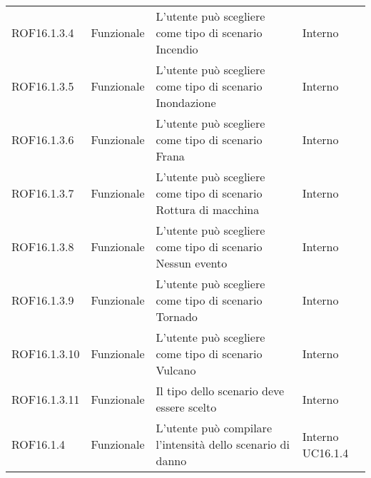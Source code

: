 \begin{longtable}{p{2cm}!{\VRule[1pt]}p{2cm}!{\VRule[1pt]}p{5cm}!{\VRule[1pt]}p{1.5cm}}
	ROF16.1.3.4                      & Funzionale\newline               & L'utente può scegliere come tipo di scenario Incendio                                                                    & Interno                      \\
	ROF16.1.3.5                      & Funzionale\newline               & L'utente può scegliere come tipo di scenario Inondazione                                                                 & Interno                      \\
	ROF16.1.3.6                      & Funzionale\newline               & L'utente può scegliere come tipo di scenario Frana                                                                       & Interno                      \\
	ROF16.1.3.7                      & Funzionale\newline               & L'utente può scegliere come tipo di scenario Rottura di macchina                                                         & Interno                      \\
	ROF16.1.3.8                      & Funzionale\newline               & L'utente può scegliere come tipo di scenario Nessun evento                                                               & Interno                      \\
	ROF16.1.3.9                      & Funzionale\newline               & L'utente può scegliere come tipo di scenario Tornado                                                                     & Interno                      \\
	ROF16.1.3.10                     & Funzionale\newline               & L'utente può scegliere come tipo di scenario Vulcano                                                                     & Interno                      \\
	ROF16.1.3.11                     & Funzionale\newline               & Il tipo dello scenario deve essere scelto                                                                                 & Interno                      \\
	ROF16.1.4                        & Funzionale\newline               & L'utente può compilare l'intensità  dello scenario di danno                                                             & Interno \newline UC16.1.4    

\end{longtable}
